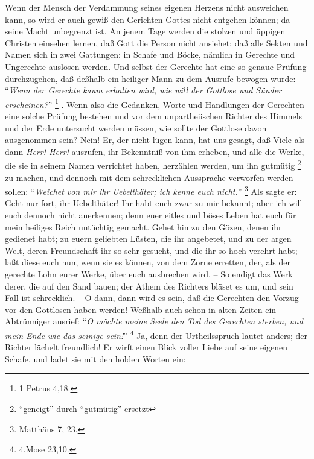 Wenn der Mensch der Verdammung seines eigenen Herzens nicht ausweichen kann, so wird er auch gewiß den Gerichten Gottes nicht entgehen können;
da seine Macht unbegrenzt ist. 
An jenem Tage werden die stolzen und üppigen Christen einsehen lernen, daß Gott die Person nicht ansiehet;
daß alle Sekten und Namen sich in zwei Gattungen: 
in Schafe und Böcke, nämlich in Gerechte und Ungerechte auslösen werden.
Und selbst der Gerechte hat eine so genaue Prüfung durchzugehen, daß deßhalb ein heiliger Mann zu dem Ausrufe bewogen wurde: "`\textit{Wenn der Gerechte kaum erhalten wird, wie will der Gottlose und Sünder erscheinen?}"' \footnote{1 Petrus 4,18.} .
Wenn also die Gedanken, Worte und Handlungen der Gerechten eine solche Prüfung bestehen und vor dem unpartheiischen Richter des Himmels und der Erde untersucht werden müssen, wie sollte der Gottlose davon ausgenommen sein?
Nein!
Er, der nicht lügen kann, hat uns gesagt, daß Viele als dann \textit{Herr! Herr!} ausrufen, ihr Bekenntniß von ihm erheben, und alle die Werke, die sie in seinem Namen verrichtet haben, herzählen werden, um ihn gutmütig \footnote{"`geneigt"' durch "`gutmütig"' ersetzt} zu machen, und dennoch mit dem schrecklichen Aussprache verworfen werden sollen:
"`\textit{Weichet von mir ihr Uebelthäter; ich kenne euch nicht.}"' \footnote{Matthäus 7, 23.} 
Als sagte er:
Geht nur fort, ihr Uebelthäter!
Ihr habt euch zwar zu mir bekannt;
aber ich will euch dennoch nicht anerkennen;
denn euer eitles und böses Leben hat euch für mein heiliges Reich untüchtig gemacht.
Gehet hin zu den Gözen, denen ihr gedienet habt;
zu euern geliebten Lüsten, die ihr angebetet, und zu der argen Welt, deren Freundschaft ihr so sehr gesucht, und die ihr so hoch verehrt habt;
laßt diese euch nun, wenn sie es können, von dem Zorne erretten, der, als der gerechte Lohn eurer Werke, über euch ausbrechen wird.
-- So endigt das Werk derer, die auf den Sand bauen;
der Athem des Richters bläset es um, und sein Fall ist schrecklich.
-- O dann, dann wird es sein, daß die Gerechten den Vorzug vor den Gottlosen haben werden!
Weßhalb auch schon in alten Zeiten ein Abtrünniger ausrief:
"`\textit{O möchte meine Seele den Tod des Gerechten sterben, und mein Ende wie das seinige sein!}"' \footnote{4.Mose 23,10.} 
Ja, denn der Urtheilsspruch lautet anders;
der Richter lächelt freundlich!
Er wirft einen Blick voller Liebe auf seine eigenen Schafe, und ladet sie mit den holden Worten ein:
